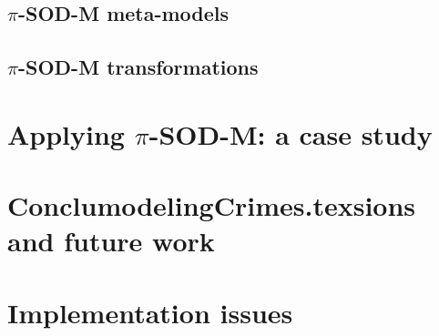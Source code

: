 \documentclass[preprint,12pt]{elsarticle}
\begin{document}
\subsection{$\pi$-SOD-M meta-models}\label{sec:pisodmmetamodels}


\subsection{$\pi$-SOD-M transformations}\label{sec:pisodmtransformations}



\section{Applying $\pi$-SOD-M: a case study}




\section{ConclumodelingCrimes.texsions and future work}\label{sec:conclusions}



\appendix

\section{Implementation issues}\label{sec:implementation}





\end{document}
